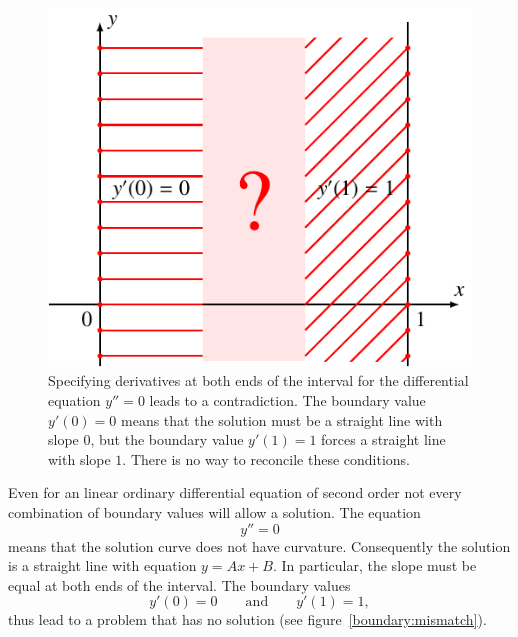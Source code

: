 \begin{beispiel}
\begin{figure}
\centering
\includegraphics{2-classification/images/mismatch.pdf}
\caption{Specifying derivatives at both ends of the interval for the
differential equation $y''=0$ leads to a contradiction.
The boundary value $y'(0)=0$ means that the solution must be a straight
line with slope $0$, but the boundary value $y'(1)=1$ forces a straight
line with slope $1$.
There is no way to reconcile these conditions.
\label{boundary:mismatch}}
\end{figure}
Even for an linear ordinary differential equation of second order
not every combination of boundary values will allow a solution.
The equation
\[
y''=0
\]
means that the solution curve does not have curvature.
Consequently the solution is a straight line with equation $y=Ax+B$.
In particular, the slope must be equal at both ends of the interval.
The boundary values
\[
y'(0)=0\qquad\text{and}\qquad y'(1)=1,
\]
thus lead to a problem that has no solution (see
figure~\eqref{boundary:mismatch}).
\end{beispiel}

